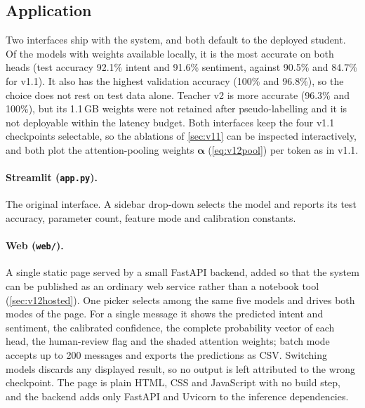 \documentclass[11pt,a4paper]{article}
\theoremstyle{remark}
\begin{document}
\subsection{Application}
\label{sec:v12app}
Two interfaces ship with the system, and both default to the deployed
student. Of the models with weights available locally, it is the most
accurate on both heads (test accuracy 92.1\% intent and 91.6\% sentiment,
against 90.5\% and 84.7\% for v1.1). It also has the highest validation
accuracy (100\% and 96.8\%), so the choice does not rest on test data alone.
Teacher v2 is more accurate (96.3\% and 100\%), but its 1.1\,GB weights were
not retained after pseudo-labelling and it is not deployable within the
latency budget. Both interfaces keep the four v1.1 checkpoints selectable, so
the ablations of \cref{sec:v11} can be inspected interactively, and both plot
the attention-pooling weights $\bm\alpha$ (\cref{eq:v12pool}) per token as in
v1.1.

\paragraph{Streamlit (\texttt{app.py}).} The original interface. A sidebar
drop-down selects the model and reports its test accuracy, parameter count,
feature mode and calibration constants.

\paragraph{Web (\texttt{web/}).} A single static page served by a small
FastAPI backend, added so that the system can be published as an ordinary web
service rather than a notebook tool (\cref{sec:v12hosted}). One picker selects
among the same five models and drives both modes of the page. For a single
message it shows the predicted intent and sentiment, the calibrated
confidence, the complete probability vector of each head, the human-review
flag and the shaded attention weights; batch mode accepts up to 200 messages
and exports the predictions as CSV. Switching models discards any displayed
result, so no output is left attributed to the wrong checkpoint. The page is
plain HTML, CSS and JavaScript with no build step, and the backend adds only
FastAPI and Uvicorn to the inference dependencies.

\end{document}
